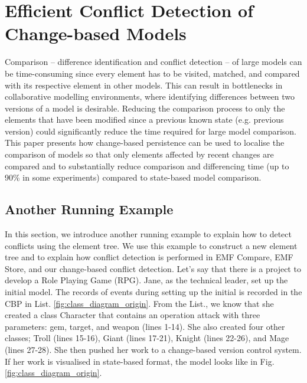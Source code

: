 \chapter{Efficient Conflict Detection of Change-based Models}
Comparison -- difference identification and conflict detection -- of large models can be time-consuming since every element has to be visited, matched, and compared with its respective element in other models. This can result in bottlenecks in collaborative modelling environments, where identifying differences between two versions of a model is desirable. Reducing the comparison process to only the elements that have been modified since a previous known state (e.g. previous version) could significantly reduce the time required for large model comparison. This paper presents how change-based persistence can be used to localise the comparison of models so that only elements affected by recent changes are compared and to substantially reduce comparison and differencing time (up to 90\% in some experiments) compared to state-based model comparison. 

\section{Another Running Example}
\label{sec:another_running_example}
In this section, we introduce another running example to explain how to detect conflicts using the element tree. We use this example to construct a new element tree and to explain how conflict detection is performed in EMF Compare, EMF Store, and our change-based conflict detection. Let's say that there is a project to develop a Role Playing Game (RPG). Jane, as the technical leader, set up the initial model. The records of events during setting up the initial is recorded in the CBP in List. \ref{fig:class_diagram_origin}. From the List., we know that she created a class \textsf{Character} that contains an operation \textsf{attack} with three parameters: \textsf{gem}, \textsf{target}, and \textsf{weapon} (lines 1-14). She also created four other classes; \textsf{Troll} (lines 15-16), \textsf{Giant} (lines 17-21), \textsf{Knight} (lines 22-26), and \textsf{Mage} (lines 27-28). She then pushed her work to a change-based version control system. If her work is visualised in state-based format, the model looks like in Fig. \ref{fig:class_diagram_origin}.

